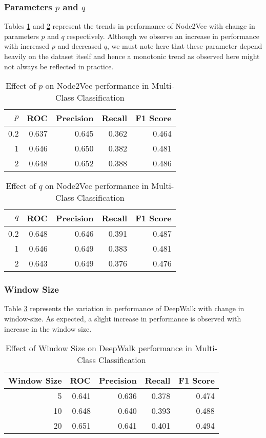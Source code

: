 \documentclass[sigconf]{acmart}
\begin{document}
\subsubsection{Parameters $p$ and $q$}
Tables \ref{tab:p} and \ref{tab:q} represent the trends in performance of Node2Vec with change in parameters $p$ and $q$ respectively. Although we observe an increase in performance with increased $p$ and decreased $q$, we must note here that these parameter depend heavily on the dataset itself and hence a monotonic trend as observed here might not always be reflected in practice.
\begin{table}[H]
\begin{tabular}{|r|r|r|r|r|}
\hline
\textbf{$p$} & \textbf{ROC} & \textbf{Precision} & \textbf{Recall} & \textbf{F1 Score}\\
\hline
0.2 & 0.637 & 0.645 & 0.362 & 0.464\\
1 & 0.646 & 0.650 & 0.382 & 0.481\\
2 & 0.648 & 0.652 & 0.388 & 0.486\\
\hline
\end{tabular}
\caption{Effect of $p$ on Node2Vec performance in Multi-Class Classification}
\label{tab:p}
\end{table}

\begin{table}[H]
\begin{tabular}{|r|r|r|r|r|}
\hline
\textbf{$q$} & \textbf{ROC} & \textbf{Precision} & \textbf{Recall} & \textbf{F1 Score}\\
\hline
0.2 & 0.648 & 0.646 & 0.391 & 0.487\\
1 & 0.646 & 0.649 & 0.383 & 0.481\\
2 & 0.643 & 0.649 & 0.376 & 0.476\\
\hline
\end{tabular}
\caption{Effect of $q$ on Node2Vec performance in Multi-Class Classification}
\label{tab:q}
\end{table}

\subsubsection{Window Size}
Table \ref{tab:window_size} represents the variation in performance of DeepWalk with change in window-size. As expected, a slight increase in performance is observed with increase in the window size.
\begin{table}[H]
\begin{tabular}{|r|r|r|r|r|}
\hline
\textbf{Window Size} & \textbf{ROC} & \textbf{Precision} & \textbf{Recall} & \textbf{F1 Score}\\
\hline
5 & 0.641 & 0.636 & 0.378 & 0.474\\
10 & 0.648 & 0.640 & 0.393 & 0.488\\
20 & 0.651 & 0.641 & 0.401 & 0.494\\
\hline
\end{tabular}
\caption{Effect of Window Size on DeepWalk performance in Multi-Class Classification}
\label{tab:window_size}
\end{table}
\end{document}
